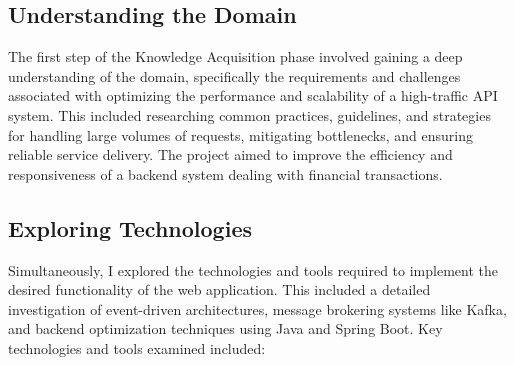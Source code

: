 \documentclass[12pt,a4paper]{report}
\begin{document}
\subsection{Understanding the Domain}

The first step of the Knowledge Acquisition phase involved gaining a deep understanding of the domain, specifically the requirements and challenges associated with optimizing the performance and scalability of a high-traffic API system. This included researching common practices, guidelines, and strategies for handling large volumes of requests, mitigating bottlenecks, and ensuring reliable service delivery. The project aimed to improve the efficiency and responsiveness of a backend system dealing with financial transactions.

\subsection{Exploring Technologies}

Simultaneously, I explored the technologies and tools required to implement the desired functionality of the web application. This included a detailed investigation of event-driven architectures, message brokering systems like Kafka, and backend optimization techniques using Java and Spring Boot. Key technologies and tools examined included:
\end{document}
